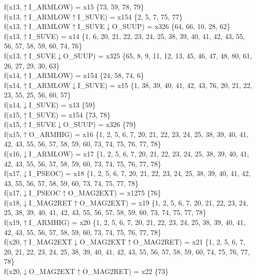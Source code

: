 f(x13,$\uparrow$I\_ARMLOW) = x15 \{73, 59, 78, 79\} \\  
f(x13,$\uparrow$I\_ARMLOW$\uparrow$I\_SUVE) = x154 \{2, 5, 7, 75, 77\} \\  
f(x13,$\uparrow$I\_ARMLOW$\uparrow$I\_SUVE$\downarrow$O\_SUUP) = x326 \{64, 66, 10, 28, 62\} \\  
f(x13,$\uparrow$I\_SUVE) = x14 \{1, 6, 20, 21, 22, 23, 24, 25, 38, 39, 40, 41, 42, 43, 55, 56, 57, 58, 59, 60, 74, 76\} \\  
f(x13,$\uparrow$I\_SUVE$\downarrow$O\_SUUP) = x325 \{65, 8, 9, 11, 12, 13, 45, 46, 47, 48, 80, 61, 26, 27, 29, 30, 63\} \\  
f(x14,$\uparrow$I\_ARMLOW) = x154 \{24, 58, 74, 6\} \\  
f(x14,$\uparrow$I\_ARMLOW$\downarrow$I\_SUVE) = x15 \{1, 38, 39, 40, 41, 42, 43, 76, 20, 21, 22, 23, 55, 25, 56, 60, 57\} \\  
f(x14,$\downarrow$I\_SUVE) = x13 \{59\} \\  
f(x15,$\uparrow$I\_SUVE) = x154 \{73, 78\} \\  
f(x15,$\uparrow$I\_SUVE$\downarrow$O\_SUUP) = x326 \{79\} \\  
f(x15,$\uparrow$O\_ARMHIG) = x16 \{1, 2, 5, 6, 7, 20, 21, 22, 23, 24, 25, 38, 39, 40, 41, 42, 43, 55, 56, 57, 58, 59, 60, 73, 74, 75, 76, 77, 78\} \\  
f(x16,$\downarrow$I\_ARMLOW) = x17 \{1, 2, 5, 6, 7, 20, 21, 22, 23, 24, 25, 38, 39, 40, 41, 42, 43, 55, 56, 57, 58, 59, 60, 73, 74, 75, 76, 77, 78\} \\  
f(x17,$\downarrow$I\_PSEOC) = x18 \{1, 2, 5, 6, 7, 20, 21, 22, 23, 24, 25, 38, 39, 40, 41, 42, 43, 55, 56, 57, 58, 59, 60, 73, 74, 75, 77, 78\} \\  
f(x17,$\downarrow$I\_PSEOC$\uparrow$O\_MAG2EXT) = x1275 \{76\} \\  
f(x18,$\downarrow$I\_MAG2RET$\uparrow$O\_MAG2EXT) = x19 \{1, 2, 5, 6, 7, 20, 21, 22, 23, 24, 25, 38, 39, 40, 41, 42, 43, 55, 56, 57, 58, 59, 60, 73, 74, 75, 77, 78\} \\  
f(x19,$\uparrow$I\_ARMHIG) = x20 \{1, 2, 5, 6, 7, 20, 21, 22, 23, 24, 25, 38, 39, 40, 41, 42, 43, 55, 56, 57, 58, 59, 60, 73, 74, 75, 76, 77, 78\} \\  
f(x20,$\uparrow$I\_MAG2EXT$\downarrow$O\_MAG2EXT$\uparrow$O\_MAG2RET) = x21 \{1, 2, 5, 6, 7, 20, 21, 22, 23, 24, 25, 38, 39, 40, 41, 42, 43, 55, 56, 57, 58, 59, 60, 74, 75, 76, 77, 78\} \\  
f(x20,$\downarrow$O\_MAG2EXT$\uparrow$O\_MAG2RET) = x22 \{73\} \\  
